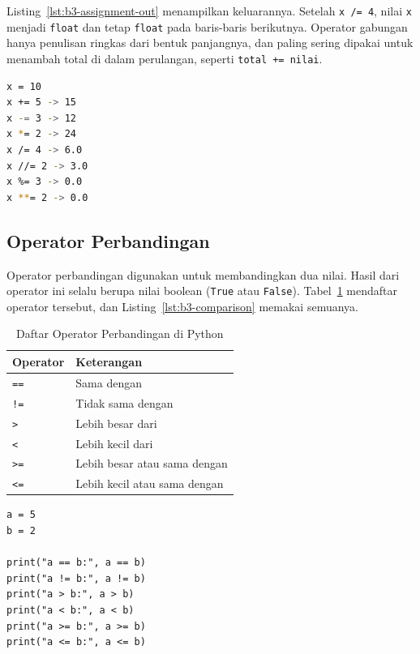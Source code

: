 Listing~\ref{lst:b3-assignment-out} menampilkan keluarannya. Setelah \texttt{x /= 4}, nilai \texttt{x} menjadi \texttt{float} dan tetap \texttt{float} pada baris-baris berikutnya. Operator gabungan hanya penulisan ringkas dari bentuk panjangnya, dan paling sering dipakai untuk menambah total di dalam perulangan, seperti \texttt{total += nilai}.

\begin{lstlisting}[language=bash, caption={Keluaran assignment_operator.py}, label={lst:b3-assignment-out}]
x = 10
x += 5 -> 15
x -= 3 -> 12
x *= 2 -> 24
x /= 4 -> 6.0
x //= 2 -> 3.0
x %= 3 -> 0.0
x **= 2 -> 0.0
\end{lstlisting}

\subsection{Operator Perbandingan}
Operator perbandingan digunakan untuk membandingkan dua nilai. 
Hasil dari operator ini selalu berupa nilai boolean (\texttt{True} atau \texttt{False}). Tabel~\ref{tab:b3-perbandingan} mendaftar operator tersebut, dan Listing~\ref{lst:b3-comparison} memakai semuanya.

\begin{table}[H]
  \centering
  \caption{Daftar Operator Perbandingan di Python}
  \label{tab:b3-perbandingan}
  \begin{tabularx}{\textwidth}{lX}
    \hline
    \textbf{Operator} & \textbf{Keterangan} \\
    \hline
    \texttt{==} & Sama dengan \\
    \hline
    \texttt{!=} & Tidak sama dengan \\
    \hline
    \texttt{>} & Lebih besar dari \\
    \hline
    \texttt{<} & Lebih kecil dari \\
    \hline
    \texttt{>=} & Lebih besar atau sama dengan \\
    \hline
    \texttt{<=} & Lebih kecil atau sama dengan \\
    \hline
  \end{tabularx}
\end{table}

\begin{lstlisting}[style=PythonStyle, caption={Kode Python: comparison_operator.py}, label={lst:b3-comparison}]
a = 5
b = 2

print("a == b:", a == b)
print("a != b:", a != b)
print("a > b:", a > b)
print("a < b:", a < b)
print("a >= b:", a >= b)
print("a <= b:", a <= b)
\end{lstlisting}

